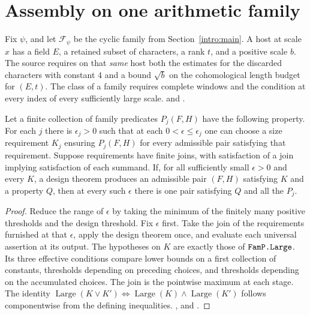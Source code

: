 \section{Assembly on one arithmetic family}\label{main:assembly}

Fix \(\psi\), and let \(\mathcal F_\psi\) be the cyclic family from Section~\ref{intro:main}. A host at scale \(x\) has a field \(E\), a retained subset of characters, a rank \(t\), and a positive scale \(b\). The source requires on that \emph{same} host both the estimates for the discarded characters with constant \(4\) and a bound \(\sqrt b\) on the cohomological length budget for \((E,t)\). The class of a family requires complete windows and the condition at every index of every sufficiently large scale.  and .

\begin{lemma}\label{red:simultaneous}
Let a finite collection of family predicates \(P_j(F,H)\) have the following property. For each \(j\) there is \(\epsilon_j>0\) such that at each \(0<\epsilon\le\epsilon_j\) one can choose a size requirement \(K_j\) ensuring \(P_j(F,H)\) for every admissible pair satisfying that requirement. Suppose requirements have finite joins, with satisfaction of a join implying satisfaction of each summand. If, for all sufficiently small \(\epsilon>0\) and every \(K\), a design theorem produces an admissible pair \((F,H)\) satisfying \(K\) and a property \(Q\), then at every such \(\epsilon\) there is one pair satisfying \(Q\) and all the \(P_j\).
\end{lemma}
\begin{proof}
Reduce the range of \(\epsilon\) by taking the minimum of the finitely many positive thresholds and the design threshold. Fix \(\epsilon\) first. Take the join of the requirements furnished at that \(\epsilon\), apply the design theorem once, and evaluate each universal assertion at its output. The hypotheses on \(K\) are exactly those of \(\texttt{FamP.Large}\). Its three effective conditions compare lower bounds on a first collection of constants, thresholds depending on preceding choices, and thresholds depending on the accumulated choices. The join is the pointwise maximum at each stage. The identity \(\operatorname{Large}(K\vee K')\Leftrightarrow\operatorname{Large}(K)\wedge\operatorname{Large}(K')\) follows componentwise from the defining inequalities. ,  and .
\end{proof}

